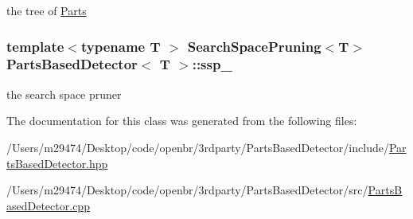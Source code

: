 the tree of \hyperlink{class_parts}{Parts} 

\hypertarget{class_parts_based_detector_aae91c693f9d01e3e6cbd552d7f81e474}{
\subsubsection[{ssp\-\_\-}]{\setlength{\rightskip}{0pt plus 5cm}template$<$typename T $>$ {\bf Search\-Space\-Pruning}$<$T$>$ {\bf Parts\-Based\-Detector}$<$ T $>$\-::ssp\-\_\-\hspace{0.3cm}{\ttfamily [private]}}}\label{class_parts_based_detector_aae91c693f9d01e3e6cbd552d7f81e474}


the search space pruner 



The documentation for this class was generated from the following files\-:\begin{DoxyCompactItemize}
\item 
/\-Users/m29474/\-Desktop/code/openbr/3rdparty/\-Parts\-Based\-Detector/include/\hyperlink{_parts_based_detector_8hpp}{Parts\-Based\-Detector.\-hpp}\item 
/\-Users/m29474/\-Desktop/code/openbr/3rdparty/\-Parts\-Based\-Detector/src/\hyperlink{_parts_based_detector_8cpp}{Parts\-Based\-Detector.\-cpp}\end{DoxyCompactItemize}
